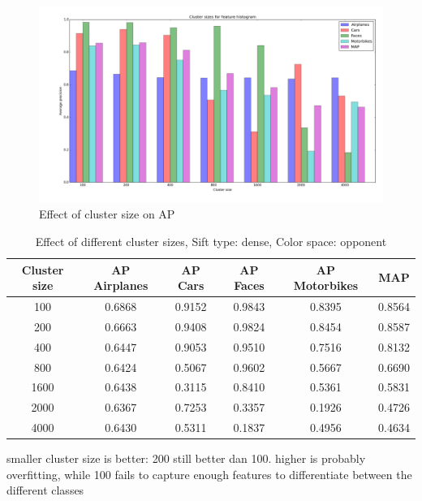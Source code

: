 \begin{figure}[H]
\includegraphics[width=\textwidth]{../plots/cluster_size_feature_histograms}
\caption{Effect of cluster size on AP}
\end{figure}
\begin{table}[H]
\begin{tabular}{|c|ccccc|}
\hline
\textbf{Cluster size} & \textbf{AP Airplanes} & \textbf{AP Cars} & \textbf{AP Faces} & \textbf{AP Motorbikes} & \textbf{MAP}\\
\hline
100& 0.6868 & 0.9152 & 0.9843 & 0.8395 & 0.8564\\
200 & 0.6663 & 0.9408 & 0.9824 & 0.8454 & 0.8587\\
400 & 0.6447 & 0.9053 & 0.9510 & 0.7516 & 0.8132\\
800 & 0.6424 & 0.5067 & 0.9602 & 0.5667 & 0.6690\\
1600 & 0.6438 & 0.3115 & 0.8410 & 0.5361 & 0.5831\\
2000 & 0.6367 & 0.7253 & 0.3357 & 0.1926 & 0.4726\\
4000 & 0.6430 & 0.5311 & 0.1837 & 0.4956 & 0.4634\\
\hline
\end{tabular}
\caption{Effect of different cluster sizes, Sift type: dense, Color space: opponent}
\end{table}

smaller cluster size is better: 200 still better dan 100. higher is probably overfitting, while 100 fails to capture enough features to differentiate between the different classes

